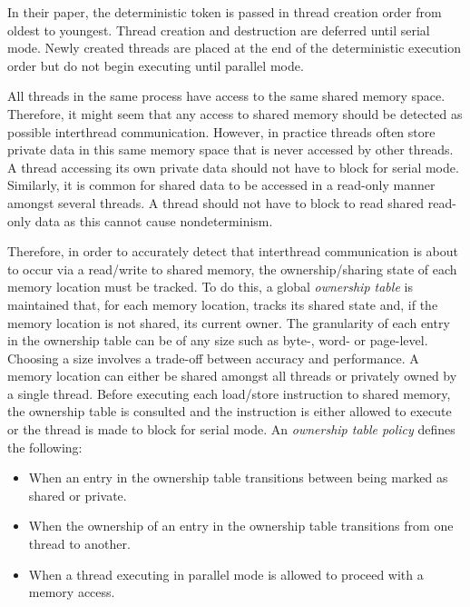In their paper, the deterministic token is passed in thread creation
order from oldest to youngest.  Thread creation and destruction are
deferred until serial mode.  Newly created threads are placed at the
end of the deterministic execution order but do not begin executing
until parallel mode.

All threads in the same process have access to the same shared memory
space.  Therefore, it might seem that any access to shared memory
should be detected as possible interthread communication.  However, in
practice threads often store private data in this same memory space
that is never accessed by other threads.  A thread accessing its own
private data should not have to block for serial mode.  Similarly, it
is common for shared data to be accessed in a read-only manner amongst
several threads.  A thread should not have to block to read shared
read-only data as this cannot cause nondeterminism.

Therefore, in order to accurately detect that interthread
communication is about to occur via a read/write to shared memory, the
ownership/sharing state of each memory location must be tracked.  To
do this, a global \emph{ownership table} is maintained that, for each
memory location, tracks its shared state and, if the memory location
is not shared, its current owner.  The granularity of each entry in
the ownership table can be of any size such as byte-, word- or
page-level.  Choosing a size involves a trade-off between accuracy and
performance.  A memory location can either be shared amongst all
threads or privately owned by a single thread.  Before executing each
load/store instruction to shared memory, the ownership table is
consulted and the instruction is either allowed to execute or the
thread is made to block for serial mode.  An \emph{ownership table
  policy} defines the following:

\begin{itemize}
\item When an entry in the ownership table transitions between being
  marked as shared or private.

\item When the ownership of an entry in the ownership table
  transitions from one thread to another.

\item When a thread executing in parallel mode is allowed to proceed
  with a memory access.
\end{itemize}

